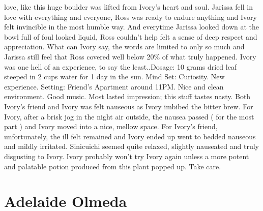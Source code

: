\documentclass[12pt]{book}
\begin{document}
love, like this huge boulder was lifted from Ivory's heart and soul. Jarissa fell in love with everything and everyone, Ross was ready to endure anything and Ivory felt invincible in the most humble way. And everytime Jarissa looked down at the bowl full of foul looked liquid, Ross couldn't help felt a sense of deep respect and appreciation. What can Ivory say, the words are limited to only so much and Jarissa still feel that Ross covered well below 20\% of what truly happened. Ivory was one hell of an experience, to say the least..Dosage: 10 grams dried leaf steeped in 2 cups water for 1 day in the sun. Mind Set: Curiosity. New experience. Setting: Friend's Apartment around 11PM. Nice and clean environment. Good music. Most lasted impression; this stuff tastes nasty. Both Ivory's friend and Ivory was felt nauseous as Ivory imbibed the bitter brew. For Ivory, after a brisk jog in the night air outside, the nausea passed ( for the most part ) and Ivory moved into a nice, mellow space. For Ivory's friend, unfortunately, the ill felt remained and Ivory ended up went to bedded nauseous and mildly irritated. Sinicuichi seemed quite relaxed, slightly nauseated and truly disgusting to Ivory. Ivory probably won't try Ivory again unless a more potent and palatable potion produced from this plant popped up. Take care.



\chapter{Adelaide Olmeda}
\end{document}
